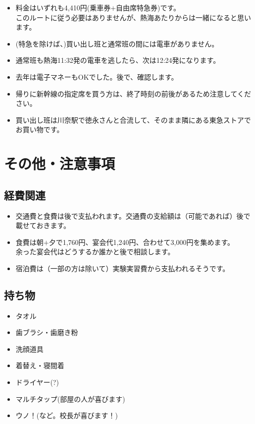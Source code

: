 \documentclass[unicode,a4paper,11pt]{ltjsarticle}
\begin{document}
\begin{itemize}
  \item
        料金はいずれも4,410円(乗車券$+$自由席特急券)です。\\
        このルートに従う必要はありませんが、熱海あたりからは一緒になると思います。
  \item
        (特急を除けば、)買い出し班と通常班の間には電車がありません。
  \item
        通常班も熱海11:32発の電車を逃したら、次は12:24発になります。
  \item
        去年は電子マネーもOKでした。後で、確認します。
  \item
        帰りに新幹線の指定席を買う方は、終了時刻の前後があるため注意してください。
  \item
        買い出し班は川奈駅で徳永さんと合流して、そのまま隣にある東急ストアでお買い物です。
\end{itemize}


\section{その他・注意事項}

\subsection*{経費関連}

\begin{itemize}
  \item
        交通費と食費は後で支払われます。交通費の支給額は（可能であれば）後で載せておきます。
  \item
        食費は朝$+$夕で1,760円、宴会代1,240円、合わせて3,000円を集めます。\\
        余った宴会代はどうするか誰かと後で相談します。
  \item
        宿泊費は（一部の方は除いて）実験実習費から支払われるそうです。
\end{itemize}

\subsection*{持ち物}

\begin{itemize}
  \item
        タオル
  \item
        歯ブラシ・歯磨き粉
  \item
        洗顔道具
  \item
        着替え・寝間着
  \item
        ドライヤー(?)
  \item
        マルチタップ(部屋の人が喜びます)
  \item
        ウノ！(など。校長が喜びます！)
\end{itemize}
\end{document}
